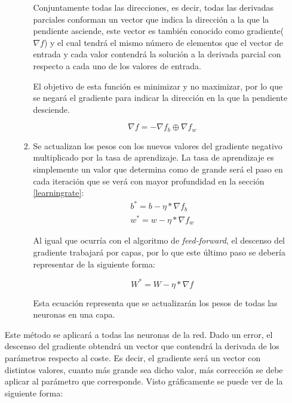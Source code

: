 \begin{itemize}
\begin{enumerate}
\begin{enumerate}
Conjuntamente todas las direcciones, es decir, todas las derivadas parciales conforman un vector que indica la dirección a la que la pendiente asciende, este vector es también conocido como gradiente($\nabla f$) y el cual tendrá el mismo número de elementos que el vector de entrada y cada valor contendrá la solución a la derivada parcial con respecto a cada uno de los valores de entrada.
\newline

El objetivo de esta función es minimizar y no maximizar, por lo que se negará el gradiente para indicar la dirección en la que la pendiente desciende.

\begin{equation}
    \nabla f = -\nabla f_b \oplus \nabla f_w
\end{equation}

\item Se actualizan los pesos con los nuevos valores del gradiente negativo multiplicado por la tasa de aprendizaje. La tasa de aprendizaje es simplemente un valor que determina como de grande será el paso en cada iteración que se verá con mayor profundidad en la sección \ref{learningrate}:
\begin{equation}
    \begin{split}
    b^* = b - \eta * \nabla f_b \\
    w^* = w - \eta * \nabla f_w
    \end{split}
\end{equation}

Al igual que ocurría con el algoritmo de \textit{feed-forward}, el descenso del gradiente trabajará por capas, por lo que este último paso se debería representar de la siguiente forma:

\begin{equation}
    W^* = W - \eta * \nabla f
\end{equation}

Esta ecuación representa que se actualizarán los pesos de todas las neuronas en una capa.

\end{enumerate}
\end{enumerate}

Este método se aplicará a todas las neuronas de la red. Dado un error, el descenso del gradiente obtendrá un vector que contendrá la derivada de los parámetros respecto al coste. Es decir, el gradiente será un vector con distintos valores, cuanto más grande sea dicho valor, más corrección se debe aplicar al parámetro que corresponde. Visto gráficamente se puede ver de la siguiente forma:


\end{itemize}

